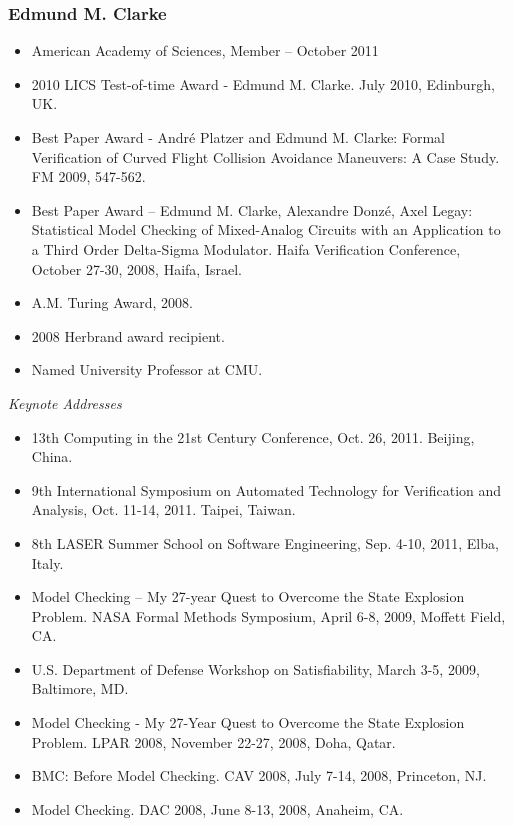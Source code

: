                 \subsubsection{Edmund M. Clarke}

                 \begin{itemize}

                 \item American Academy of Sciences, Member -- October 2011
                 \item 2010 LICS Test-of-time Award - Edmund M. Clarke. July 2010, Edinburgh, UK.
                 \item Best Paper Award - André Platzer and Edmund M. Clarke: Formal Verification of Curved Flight Collision Avoidance Maneuvers: A Case Study. FM 2009, 547-562. 
                 \item Best Paper Award – Edmund M. Clarke, Alexandre Donzé, Axel Legay: Statistical Model Checking of Mixed-Analog Circuits with an Application to a Third Order Delta-Sigma Modulator. Haifa Verification Conference, October 27-30, 2008, Haifa, Israel.
                 \item A.M. Turing Award, 2008.
                 \item 2008 Herbrand award recipient.
                 \item Named University Professor at CMU.

                 
                 \end{itemize}

                 \emph{Keynote Addresses}

                 \begin{itemize}

                    \item 13th Computing in the 21st Century Conference, Oct. 26, 2011. Beijing, China.
                    \item 9th International Symposium on Automated Technology for Verification and Analysis,
                    Oct. 11-14, 2011. Taipei, Taiwan.
                    \item 8th LASER Summer School on Software Engineering, Sep. 4-10, 2011, Elba, Italy. 
                    \item Model Checking – My 27-year Quest to Overcome the State Explosion Problem. NASA Formal Methods Symposium, April 6-8, 2009, Moffett Field, CA.
                    \item U.S. Department of Defense Workshop on Satisfiability, March 3-5, 2009, Baltimore, MD.
                    \item Model Checking - My 27-Year Quest to Overcome the State Explosion Problem. LPAR 2008, November 22-27, 2008, Doha, Qatar.
                    \item BMC: Before Model Checking. CAV 2008, July 7-14, 2008, Princeton, NJ.
                    \item Model Checking. DAC 2008, June 8-13, 2008, Anaheim, CA.
                 \end{itemize}

